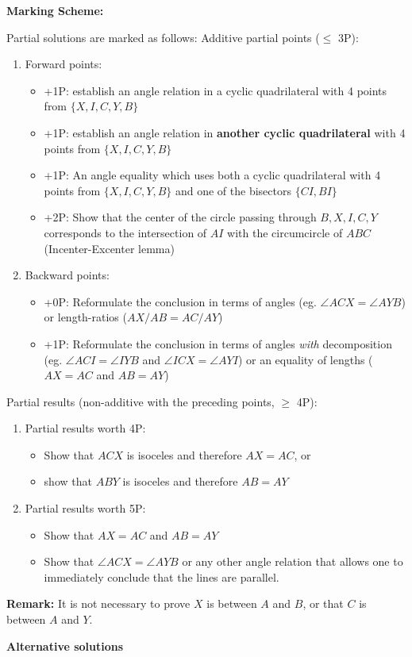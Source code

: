 {\textbf{Marking Scheme:}

Partial solutions are marked as follows:
Additive partial points ($\leq$ 3P):
\begin{enumerate}
    \item Forward points:

\begin{itemize}
    \item +1P: establish an angle relation in a cyclic quadrilateral with 4 points from $\{X,I,C,Y,B\}$
    \item +1P: establish an angle relation in \textbf{another cyclic quadrilateral} with 4 points from $\{X,I,C,Y,B\}$
    \item +1P: An angle equality which uses both a cyclic quadrilateral with 4 points from $\{X,I,C,Y,B\}$ and one of the bisectors $\{CI,BI\}$
    \item +2P: Show that the center of the circle passing through $B,X,I,C,Y$ corresponds to the intersection of $AI$ with the circumcircle of $ABC$ (Incenter-Excenter lemma)
\end{itemize}

    \item Backward points:
\begin{itemize}
    \item +0P: Reformulate the conclusion in terms of angles (eg. $\angle ACX=\angle AYB$) or length-ratios ($AX/AB=AC/AY$)
    \item +1P: Reformulate the conclusion in terms of angles \emph{with} decomposition (eg. $\angle ACI=\angle IYB$ and $\angle ICX=\angle AYI$) or an equality of lengths ($AX=AC$ and $AB=AY$)
\end{itemize}

\end{enumerate}

Partial results (non-additive with the preceding points, $\geq$ 4P):
\begin{enumerate}
\item Partial results worth 4P:
\begin{itemize}
    \item Show that $ACX$ is isoceles and therefore $AX=AC$, or
    \item show that $ABY$ is isoceles and therefore $AB=AY$
\end{itemize}

\item Partial results worth 5P:
\begin{itemize}
    \item Show that $AX=AC$ and $AB=AY$
    \item Show that $\angle ACX=\angle AYB$ or any other angle relation that allows one to immediately conclude that the lines are parallel.
\end{itemize}
\end{enumerate}

\textbf{Remark:}
It is not necessary to prove $X$ is between $A$ and $B$, or that $C$ is between $A$ and $Y$.
}
\newpage
\textbf{Alternative solutions}

